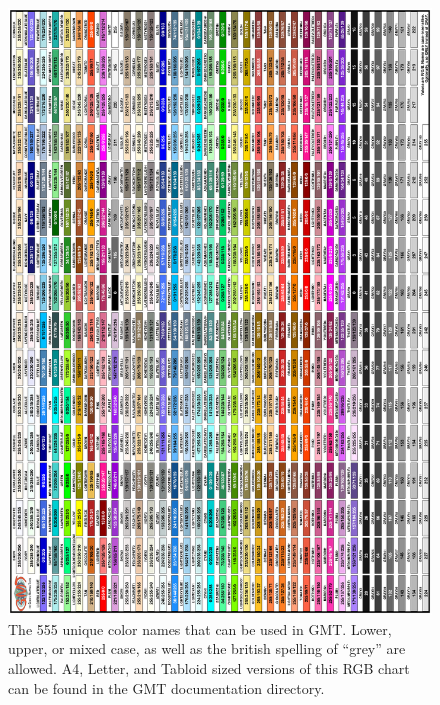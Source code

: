 \begin{figure}
   \includegraphics[angle=90,width=\textwidth]{scripts/GMT_RGBchart_a4}
   \caption{The 555 unique color names that can be used in GMT. Lower, upper, or mixed case, as well as the british
   spelling of ``grey'' are allowed. A4, Letter, and Tabloid sized versions of this RGB chart can be found in the
   GMT documentation directory.}
   \label{fig:RGBchart}
\end{figure}

